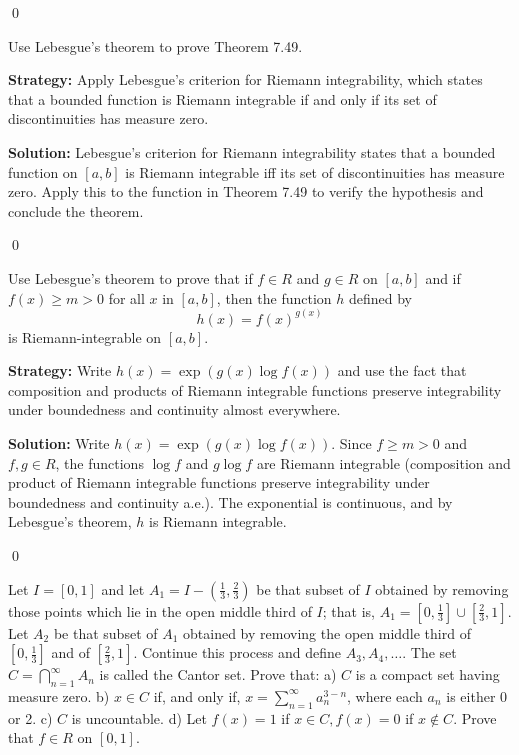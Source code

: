 \qed
\begin{problembox}
Use Lebesgue's theorem to prove Theorem 7.49.
\end{problembox}

\noindent\textbf{Strategy:} Apply Lebesgue's criterion for Riemann integrability, which states that a bounded function is Riemann integrable if and only if its set of discontinuities has measure zero.

\bigskip\noindent\textbf{Solution:}
Lebesgue's criterion for Riemann integrability states that a bounded function on $[a,b]$ is Riemann integrable iff its set of discontinuities has measure zero. Apply this to the function in Theorem 7.49 to verify the hypothesis and conclude the theorem.




\qed
\begin{problembox}
Use Lebesgue's theorem to prove that if $f \in R$ and $g \in R$ on $[a, b]$ and if $f(x) \geq m > 0$ for all $x$ in $[a, b]$, then the function $h$ defined by
\[h(x) = f(x)^{g(x)}\]
is Riemann-integrable on $[a, b]$.
\end{problembox}

\noindent\textbf{Strategy:} Write $h(x) = \exp(g(x) \log f(x))$ and use the fact that composition and products of Riemann integrable functions preserve integrability under boundedness and continuity almost everywhere.

\bigskip\noindent\textbf{Solution:}
Write $h(x)=\exp(g(x)\log f(x))$. Since $f\ge m>0$ and $f,g\in R$, the functions $\log f$ and $g\log f$ are Riemann integrable (composition and product of Riemann integrable functions preserve integrability under boundedness and continuity a.e.). The exponential is continuous, and by Lebesgue's theorem, $h$ is Riemann integrable.




\qed
\begin{problembox}
Let $I = [0, 1]$ and let $A_1 = I - (\frac{1}{3}, \frac{2}{3})$ be that subset of $I$ obtained by removing those points which lie in the open middle third of $I$; that is, $A_1 = [0, \frac{1}{3}] \cup [\frac{2}{3}, 1]$. Let $A_2$ be that subset of $A_1$ obtained by removing the open middle third of $[0, \frac{1}{3}]$ and of $[\frac{2}{3}, 1]$. Continue this process and define $A_3, A_4, \ldots$. The set $C = \bigcap_{n=1}^{\infty} A_n$ is called the Cantor set. Prove that:
a) $C$ is a compact set having measure zero.
b) $x \in C$ if, and only if, $x = \sum_{n=1}^{\infty} a_n^{3-n}$, where each $a_n$ is either 0 or 2.
c) $C$ is uncountable.
d) Let $f(x) = 1$ if $x \in C, f(x) = 0$ if $x \notin C$. Prove that $f \in R$ on $[0, 1]$.
\end{problembox}

